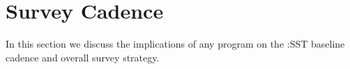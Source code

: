 \section{Survey Cadence}

In this section we discuss the implications of any \es program on the :SST baseline cadence and overall survey strategy.
